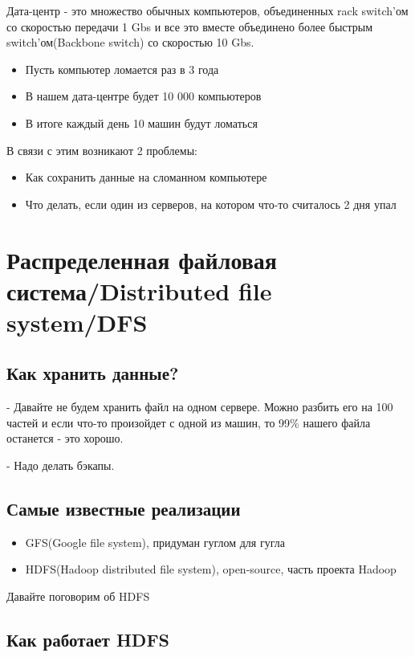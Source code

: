 \documentclass{article}
\begin{document}
Дата-центр - это множество обычных компьютеров, объединенных rack switch'ом со скоростью передачи 1 Gbs и все это вместе объединено более быстрым switch'ом(Backbone switch) со скоростью 10 Gbs.

\begin{itemize}
    \item Пусть компьютер ломается раз в 3 года
    \item В нашем дата-центре будет 10 000 компьютеров
    \item В итоге каждый день 10 машин будут ломаться
\end{itemize}

В связи с этим возникают 2 проблемы:

\begin{itemize}
    \item Как сохранить данные на сломанном компьютере
    \item Что делать, если один из серверов, на котором что-то считалось 2 дня упал
\end{itemize}

\section{Распределенная файловая система/Distributed file system/DFS}

\subsection{Как хранить данные?}

- Давайте не будем хранить файл на одном сервере. Можно разбить его на 100 частей и если что-то произойдет с одной из машин, то 99\% нашего файла останется - это хорошо.


- Надо делать бэкапы.

\subsection{Самые известные реализации}

\begin{itemize}
    \item GFS(Google file system), придуман гуглом для гугла
    \item HDFS(Hadoop distributed file system), open-source, часть проекта Hadoop
\end{itemize}

Давайте поговорим об HDFS

\subsection{Как работает HDFS}
\end{document}
